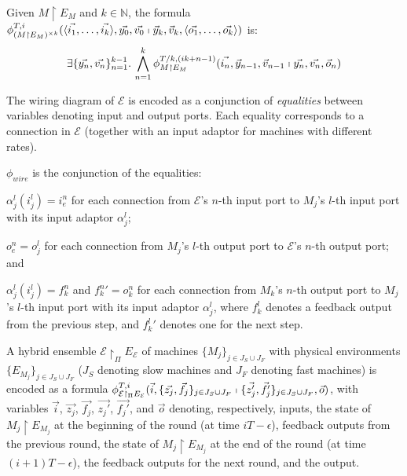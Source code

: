 \begin{definition}
Given $M \restriction E_M$ and $k \in \mathbb{N}$,
the formula
$\phi_{(M \restriction E_M)^{\times k}}^{T,
  i}(\langle\vec{i_1},\ldots,\vec{i_k}\rangle, \vec{y_0}, \vec{v_0}
\shortmid \vec{y}_{k}, \vec{v}_{k},
\langle\vec{o_1},\ldots,\vec{o_k}\rangle)$ is: 
\[
\exists\{\vec{y_n}, \vec{v_n}\}_{n=1}^{k-1}.\,
\bigwedge_{n=1}^k \phi_{M \restriction E_M}^{T/k,(ik+n-1)}(\vec{i_n}, \vec{y}_{n-1}, \vec{v}_{n-1} \shortmid \vec{y_{n}}, \vec{v_{n}}, \vec{o}_n)
\]
\end{definition}

The wiring diagram of $\mathcal{E}$ is encoded as
a conjunction of %
\emph{equalities} between variables denoting input and output ports.
Each equality corresponds to a connection in $\mathcal{E}$
(together with an input adaptor for machines with different rates).


\begin{definition}
$\phi_\mathit{wire}$ is the conjunction of the equalities:
\begin{inparaenum}[(i)]
	\item $\alpha_j^l(i_j^l) = i_e^n$
	for each connection from $\mathcal{E}$'s $n$-th input port to $M_j$'s $l$-th input port 
	with its input adaptor $\alpha_j^l$;
	\item $o_e^n = o_j^l$
	for each connection from $M_j$'s $l$-th output port to $\mathcal{E}$'s $n$-th output port; and
	\item $\alpha_j^l(i_j^l) = f_k^n$ and ${f_k^n}' = o_k^n$
	for each connection from $M_k$'s $n$-th output port to $M_j$'s $l$-th input port with its input adaptor $\alpha_j^l$,
	where $f_k^l$ denotes a feedback output from the previous step, 
	and ${f_k^l}'$ denotes one for the next step.
\end{inparaenum}
\end{definition}


A hybrid ensemble $\mathcal{E} \restriction_{\Pi} E_\mathcal{E}$ 
of machines  $\{M_j\}_{j\in J_S\cup J_F}$ with physical environments $\{E_{M_j}\}_{j\in J_S\cup J_F}$
($J_S$ denoting slow machines and $J_F$ denoting fast machines) is
encoded as a formula 
$\phi_{\mathcal{E} \restriction_{\Pi} E_\mathcal{E}}^{T,i}(
	\vec{i}, \{\vec{z_j},\vec{f_j}\}_{j\in J_S\cup J_F}
	\shortmid 
	\{\vec{z'_j}, \vec{f_j'}\}_{j\in J_S\cup J_F}, \vec{o})$,
%
with variables $\vec{i}$, $\vec{z_j}$, $\vec{f_j}$, $\vec{z_j'}$,
$\vec{f_j'}$, and $\vec{o}$ denoting, respectively, 
inputs, the state of $M_j \restriction E_{M_j}$ at the beginning of the round 
		(at time $iT - \epsilon$),
feedback outputs from the previous round,
	the  state of $M_j \restriction E_{M_j}$ at the end of the round 
		(at time $(i+1)T - \epsilon$), 
the feedback outputs for the next round,	and 
the output.


